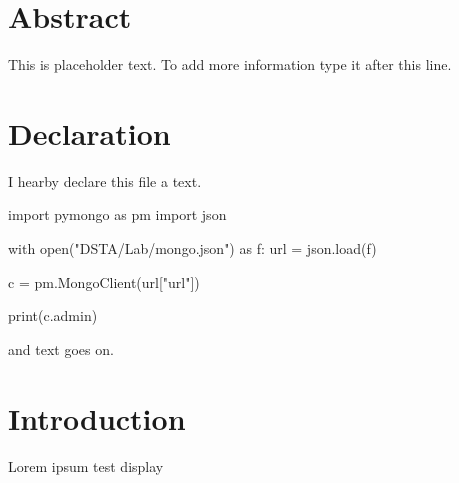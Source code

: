 \documentclass[12pt]{report}
\begin{document}
\section*{Abstract}
This is placeholder text. To add more information type it after this line.\\
\cleardoublepage


\section*{Declaration}
I hearby declare this file a text.

\begin{python}
    import pymongo as pm
    import json

    with open("DSTA/Lab/mongo.json") as f:
    url = json.load(f)


    c = pm.MongoClient(url["url"])

    print(c.admin)
\end{python}
and text goes on.\\
\cleardoublepage

\tableofcontents
\thispagestyle{empty}
\cleardoublepage

\setcounter{page}{1}



\section{Introduction}
Lorem ipsum
test display 
\end{document}
